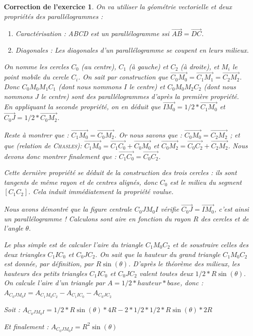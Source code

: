 \documentclass[12pt]{article}
\theoremstyle{break}
\newtheorem{cor}{Correction de l'exercice}
\begin{document}
\begin{cor}
On va utiliser la géométrie vectorielle et deux propriétés des parallélogrammes :\begin{enumerate}
\item \textit{Caractérisation} : ABCD est un parallélogramme ssi $\overrightarrow{AB} = \overrightarrow{DC}$.
\item \textit{Diagonales} : Les diagonales d'un parallélogramme se coupent en leurs milieux.
\end{enumerate}

On nomme les cercles $C_0$ (au centre), $C_1$ (à gauche) et $C_2$ (à droite), et $M_i$ le point mobile du cercle $C_i$. On sait par construction que $\overrightarrow{C_0 M_0} = \overrightarrow{C_1 M_1} = \overrightarrow{C_2 M_2}$. Donc $C_0 M_0 M_1 C_1$ (dont nous nommons $I$ le centre) et $C_0 M_0 M_2 C_2$ (dont nous nommons $J$ le centre) sont des parallélogrammes d'après la première propriété. En appliquant la seconde propriété, on en déduit que $\overrightarrow{I M_0} = 1/2 * \overrightarrow{C_1 M_0}$ et $\overrightarrow{C_0 J} = 1/2 * \overrightarrow{C_0 M_2}$.

Reste à montrer que : $\overrightarrow{C_1 M_0} = \overrightarrow{C_0 M_2}$. Or nous savons que : $\overrightarrow{C_0 M_0} = \overrightarrow{C_2 M_2}$ ; et que (relation de \textsc{Chasles}): $\overrightarrow{C_1 M_0} = \overrightarrow{C_1 C_0} + \overrightarrow{C_0 M_0}$ et $\overrightarrow{C_0 M_2} = \overrightarrow{C_0 C_2} + \overrightarrow{C_2 M_2}$. Nous devons donc montrer finalement que : $\overrightarrow{C_1 C_0} = \overrightarrow{C_0 C_2}$.

Cette dernière propriété se déduit de la construction des trois cercles : ils sont tangents de même rayon et de centres alignés, donc $C_0$ est le milieu du segment $[C_1 C_2]$. Cela induit immédiatement la propriété voulue.

Nous avons démontré que la figure centrale $C_0 J M_0 I$ vérifie $\overrightarrow{C_0 J} = \overrightarrow{I M_0}$, c'est ainsi un parallélogramme ! Calculons sont aire en fonction du rayon $R$ des cercles et de l'angle $\theta$.

Le plus simple est de calculer l'aire du triangle $C_1 M_0 C_2$ et de soustraire celles des deux triangles $C_1 I C_0$ et $C_0 J C_2$. On sait que la hauteur du grand triangle $C_1 M_0 C_2$ est donnée, par définition, par $R \sin(\theta)$. D'après le théorème des milieux, les hauteurs des petits triangles $C_1 I C_0$ et $C_0 J C_2$ valent toutes deux $1/2 * R \sin(\theta)$. On calcule l'aire d'un triangle par $A = 1/2 * hauteur * base$, donc :
$A_{C_0 J M_0 I} = A_{C_1 M_0 C_2} - A_{C_1 I C_0} - A_{C_0 J C_2}$

Soit : $A_{C_0 J M_0 I} = 1/2 * R \sin(\theta) * 4R - 2 * 1/2 * 1/2 * R \sin(\theta) * 2R$

Et finalement : $A_{C_0 J M_0 I} = R^2 \sin(\theta)$
\end{cor}
\end{document}
